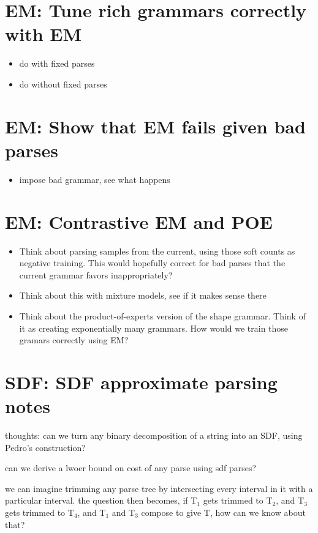 \documentclass{book}
\begin{document}
\section{EM: Tune rich grammars correctly with EM}
\label{sec-5_24}

\begin{itemize}
\item do with fixed parses
\item do without fixed parses
\end{itemize}
\section{EM: Show that EM fails given bad parses}
\label{sec-5_25}

\begin{itemize}
\item impose bad grammar, see what happens
\end{itemize}
\section{EM: Contrastive EM and POE}
\label{sec-5_26}


\begin{itemize}
\item Think about parsing samples from the current, using those soft
    counts as negative training. This would hopefully correct for bad
    parses that the current grammar favors inappropriately?
\item Think about this with mixture models, see if it makes sense there
\item Think about the product-of-experts version of the shape
    grammar. Think of it as creating exponentially many grammars. How
    would we train those gramars correctly using EM?
\end{itemize}
\section{SDF: SDF approximate parsing notes}
\label{sec-5_27}

thoughts: can we turn any binary decomposition of a string into an
SDF, using Pedro's construction?

can we derive a lwoer bound on cost of any parse using sdf parses?

we can imagine trimming any parse tree by intersecting every interval
in it with a particular interval. the question then becomes, if T$_1$
gets trimmed to T$_2$, and T$_3$ gets trimmed to T$_4$, and T$_1$ and T$_3$
compose to give T, how can we know about that?
\end{document}
